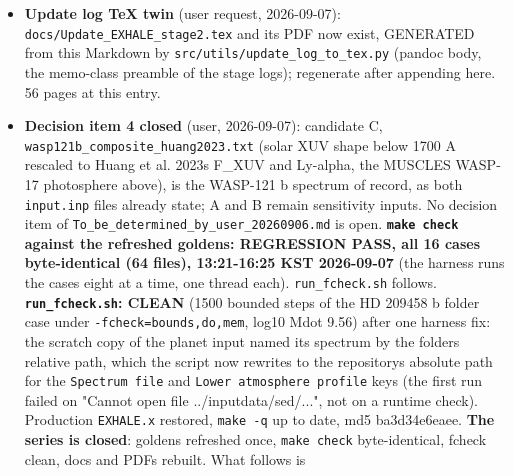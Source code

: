 \documentclass[english,a4paper]{my_memo}
\begin{document}
\begin{itemize}
  page 11 into the footer; it is now a \texttt{longtable} with the caption at its
  head, breaking across pages 10-11 with a "continued" foot. PDF rebuilt.
  Pages 20-21 (user report): the keyword table\textquotesingle s long file paths were
  unbreakable \texttt{\textbackslash{}texttt} tokens and ran past the right margin; 18 such paths
  are now \texttt{\textbackslash{}path\{\}} (url package, breaks at \texttt{/} and \texttt{\_}), one inside a
  caption kept as \texttt{\textbackslash{}texttt} (a moving argument). Rebuilt with latexmk, so
  the longtable column widths and cross-references are resolved (a single
  \texttt{pdflatex} pass leaves both unresolved, which is what produced the
  "Table ??" and the first overflow the user saw).
\item
  \textbf{Update log TeX twin} (user request, 2026-09-07): \texttt{docs/Update\_EXHALE\_stage2.tex}
  and its PDF now exist, GENERATED from this Markdown by
  \texttt{src/utils/update\_log\_to\_tex.py} (pandoc body, the memo-class preamble of
  the stage logs); regenerate after appending here. 56 pages at this entry.
\item
  \textbf{Decision item 4 closed} (user, 2026-09-07): candidate C,
  \texttt{wasp121b\_composite\_huang2023.txt} (solar XUV shape below 1700 A rescaled to
  Huang et al. 2023\textquotesingle s F\_XUV and Ly-alpha, the MUSCLES WASP-17 photosphere
  above), is the WASP-121 b spectrum of record, as both \texttt{input.inp} files
  already state; A and B remain sensitivity inputs. No decision item of
  \texttt{To\_be\_determined\_by\_user\_20260906.md} is open.
  \textbf{\texttt{make\ check} against the refreshed goldens: REGRESSION PASS, all 16 cases
  byte-identical (64 files), 13:21-16:25 KST 2026-09-07} (the harness runs
  the cases eight at a time, one thread each). \texttt{run\_fcheck.sh} follows.
  \textbf{\texttt{run\_fcheck.sh}: CLEAN} (1500 bounded steps of the HD 209458 b folder
  case under \texttt{-fcheck=bounds,do,mem}, log10 Mdot 9.56) after one harness fix:
  the scratch copy of the planet input named its spectrum by the folder\textquotesingle s
  relative path, which the script now rewrites to the repository\textquotesingle s absolute
  path for the \texttt{Spectrum\ file} and \texttt{Lower\ atmosphere\ profile} keys (the first
  run failed on "Cannot open file ../inputdata/sed/...", not on a runtime
  check). Production \texttt{EXHALE.x} restored, \texttt{make\ -q} up to date, md5
  ba3d34e6eaee. \textbf{The series is closed}: goldens refreshed once, \texttt{make\ check} byte-identical, fcheck clean, docs and PDFs rebuilt. What follows is

\end{itemize}
\end{document}
